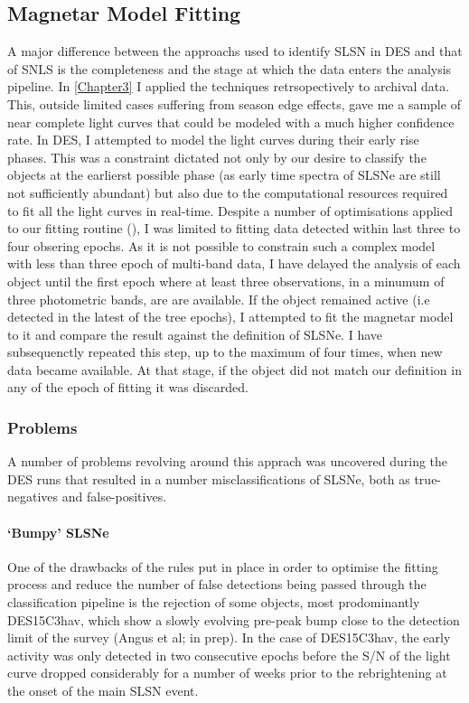 \subsection{Magnetar Model Fitting}
A major difference between the approachs used to identify SLSN in DES and that of SNLS is the completeness and the stage at which the data enters the analysis pipeline. In \cref{Chapter3} I applied the techniques retrsopectively to archival data. This, outside limited cases suffering from season edge effects, gave me a sample of near complete light curves that could be modeled with a much higher confidence rate. In DES, I attempted to model the light curves during their early rise phases. This was a constraint dictated not only by our desire to classify the objects at the earlierst possible phase (as early time spectra of SLSNe are still not sufficiently abundant) but also due to the computational resources required to fit all the light curves in real-time. Despite a number of optimisations applied to our fitting routine (), I was limited to fitting data detected within last three to four obsering epochs. As it is not possible to constrain such a complex model with less than three epoch of multi-band data, I have delayed the analysis of each object until the first epoch where at least three observations, in a minumum of three photometric bands, are are available. If the object remained active (i.e detected in the latest of the tree epochs), I attempted to fit the magnetar model to it and compare the result against the definition of SLSNe. I have subsequenctly repeated this step, up to the maximum of four times, when new data became available. At that stage, if the object did not match our definition in any of the epoch of fitting it was discarded.

\subsubsection{Problems}
A number of problems revolving around this apprach was uncovered during the DES runs that resulted in a number misclassifications of SLSNe, both as true-negatives and false-positives.

\paragraph{`Bumpy' SLSNe}
One of the drawbacks of the rules put in place in order to optimise the fitting process and reduce the number of false detections being passed through the classification pipeline is the rejection of some objects, most prodominantly DES15C3hav, which show a slowly evolving pre-peak bump close to the detection limit of the survey (Angus et al; in prep). In the case of DES15C3hav, the early activity was only detected in two consecutive epochs before the S/N of the light curve dropped considerably for a number of weeks prior to the rebrightening at the onset of the main SLSN event.

